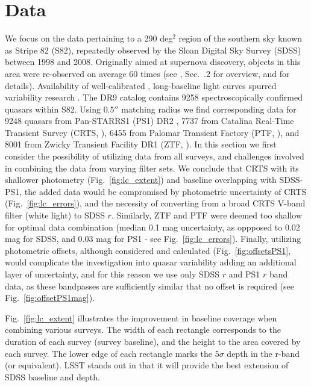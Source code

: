 \documentclass[twocolumn]{aastex62}
\begin{document}
\section{Data}
\label{sec:data}

We focus on the data pertaining to a 290 deg$^{2}$ region of the southern sky known as Stripe 82 (S82), repeatedly observed by the Sloan Digital Sky Survey (SDSS) between 1998 and 2008. Originally aimed at supernova discovery, objects in this area were re-observed on average 60 times (see \citealt{macleod2012}, Sec.~.2 for overview, and \citealt{annis2014} for details). Availability of well-calibrated \citep{ivezic2007}, long-baseline light curves spurred variability research \citep{sesar2007}. The DR9 catalog \citep{schneider2008} contains 9258 spectroscopically confirmed quasars within S82. Using $0.5 ''$ matching radius we find corresponding data for 9248 quasars from  Pan-STARRS1 (PS1) DR2 \citep{chambers2016,flewelling2016,flewelling2018}, 7737 from Catalina Real-Time Transient Survey (CRTS, \citealt{drake2009}),  6455 from Palomar Transient Factory (PTF, \citealt{rau2009}), and 8001 from Zwicky Transient Facility DR1 (ZTF, \citealt{bellm2019,masci2019}). In this section we first consider the possibility of utilizing data from all surveys, and challenges involved in combining the data from varying filter sets. We conclude that CRTS with its shallower photometry (Fig.~\ref{fig:lc_extent}) and baseline overlapping with SDSS-PS1, the added data would be compromised by photometric uncertainty of CRTS (Fig.~\ref{fig:lc_errors}), and the necessity of converting from a broad CRTS V-band filter (white light) to SDSS $r$. Similarly, ZTF and PTF  were deemed too shallow for optimal data combination (median 0.1 mag uncertainty, as oppposed to 0.02 mag for SDSS,  and 0.03 mag for PS1 - see Fig.~\ref{fig:lc_errors}). Finally, utilizing photometric offsets, although considered and calculated (Fig.~\ref{fig:offsetsPS1}, would complicate the investigation into quasar variability  adding an additional  layer of uncertainty, and for this reason we use only SDSS $r$ and PS1 $r$ band data, as these bandpasses are sufficiently similar that no offset is required (see Fig.~\ref{fig:offsetPS1mag}).

Fig.~\ref{fig:lc_extent} illustrates the improvement in baseline coverage when combining various surveys. The width of each rectangle corresponds to the duration of each survey (survey baseline), and the height to the area covered by each survey. The lower edge of each rectangle marks the $5\sigma$ depth in the r-band (or equivalent). LSST stands out in that it will provide the best extension of SDSS baseline and depth.  
\end{document}
